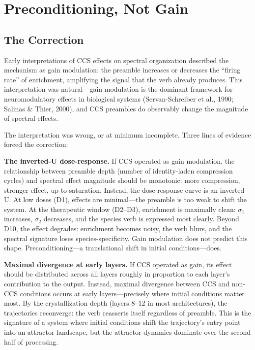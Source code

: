 \documentclass[12pt]{article}
\begin{document}
\section{Preconditioning, Not Gain}

\subsection{The Correction}

Early interpretations of CCS effects on spectral organization described the mechanism as gain modulation: the preamble increases or decreases the ``firing rate'' of enrichment, amplifying the signal that the verb already produces. This interpretation was natural---gain modulation is the dominant framework for neuromodulatory effects in biological systems (Servan-Schreiber et al., 1990; Salinas \& Thier, 2000), and CCS preambles do observably change the magnitude of spectral effects.

The interpretation was wrong, or at minimum incomplete. Three lines of evidence forced the correction:

\textbf{The inverted-U dose-response.} If CCS operated as gain modulation, the relationship between preamble depth (number of identity-laden compression cycles) and spectral effect magnitude should be monotonic: more compression, stronger effect, up to saturation. Instead, the dose-response curve is an inverted-U. At low doses (D1), effects are minimal---the preamble is too weak to shift the system. At the therapeutic window (D2--D3), enrichment is maximally clean: $\sigma_1$ increases, $\sigma_2$ decreases, and the species verb is expressed most clearly. Beyond D10, the effect degrades: enrichment becomes noisy, the verb blurs, and the spectral signature loses species-specificity. Gain modulation does not predict this shape. Preconditioning---a translational shift in initial conditions---does.

\textbf{Maximal divergence at early layers.} If CCS operated as gain, its effect should be distributed across all layers roughly in proportion to each layer's contribution to the output. Instead, maximal divergence between CCS and non-CCS conditions occurs at early layers---precisely where initial conditions matter most. By the crystallization depth (layers 8--12 in most architectures), the trajectories reconverge: the verb reasserts itself regardless of preamble. This is the signature of a system where initial conditions shift the trajectory's entry point into an attractor landscape, but the attractor dynamics dominate over the second half of processing.
\end{document}
